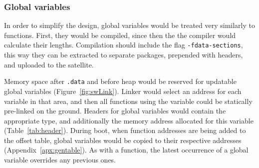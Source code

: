 \subsubsection{Global variables}

In order to simplify the design, global variables would be treated very similarly to functions. First, they would be compiled, since then the the compiler would calculate their lengths. Compilation should include the flag \texttt{-fdata-sections}, this way they can be extracted to separate packages, prepended with headers, and uploaded to the satellite.

Memory space after \texttt{.data} and before heap would be reserved for updatable global variables  (Figure~\ref{fig:swLink}). Linker would select an address for each variable in that area, and then all functions using the variable could be statically pre-linked on the ground. Headers for global variables would contain the appropriate type, and additionally the memory address allocated for this variable (Table~\ref{tab:header}). During boot, when function addresses are being added to the offset table, global variables would be copied to their respective addresses (Appendix~\ref{apx:gentable}). As with a function, the latest occurrence of a global variable overrides any previous ones.
